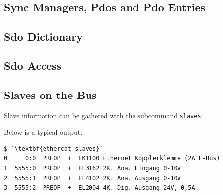 \documentclass[a4paper,12pt,BCOR6mm,bibtotoc,idxtotoc]{scrbook}
\begin{document}
\subsection{Sync Managers, Pdos and Pdo Entries}




\subsection{Sdo Dictionary}




\subsection{Sdo Access}






\subsection{Slaves on the Bus}

Slave information can be gathered with the subcommand \lstinline+slaves+:



Below is a typical output:

\begin{lstlisting}
$ `\textbf{ethercat slaves}`
0     0:0  PREOP  +  EK1100 Ethernet Kopplerklemme (2A E-Bus)
1  5555:0  PREOP  +  EL3162 2K. Ana. Eingang 0-10V
2  5555:1  PREOP  +  EL4102 2K. Ana. Ausgang 0-10V
3  5555:2  PREOP  +  EL2004 4K. Dig. Ausgang 24V, 0,5A
\end{lstlisting}

\end{document}
